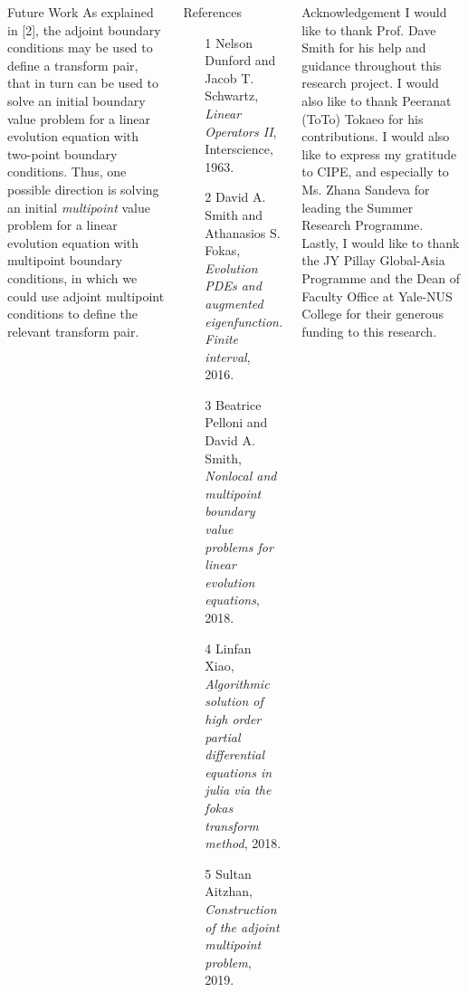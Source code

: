 \documentclass[serif, final, noamsthm]{beamer} %
\begin{document}
\begin{center}
\begin{frame}
\begin{columns}[t]
{\begin{block}{Future Work}
\justifying
As explained in [2], the adjoint boundary conditions may be used to define a transform pair, that in turn can be used to solve an initial boundary value problem for a linear evolution equation with two-point boundary conditions. Thus, one possible direction is solving an initial \emph{multipoint} value problem for a linear evolution equation with multipoint boundary conditions, in which we could use adjoint multipoint conditions to define the relevant transform pair. 
\end{block}
\begin{block}{References}
\begin{itemize}
\item[1] Nelson Dunford and Jacob T. Schwartz, \textit{Linear Operators II}, Interscience, 1963.
\item[2] David A. Smith and Athanasios S. Fokas, \textit{Evolution PDEs and augmented eigenfunction. Finite interval}, 2016.
\item[3] Beatrice Pelloni and David A. Smith, \textit{Nonlocal and multipoint boundary value problems for linear evolution equations}, 2018.
\item[4] Linfan Xiao, \textit{Algorithmic solution of high order partial differential equations in julia via the fokas transform method}, 2018.
\item[5] Sultan Aitzhan, \textit{Construction of the adjoint multipoint problem}, 2019.
\end{itemize}
\end{block}
          
\begin{block}{Acknowledgement}
\justifying
I would like to thank Prof. Dave Smith for his help and guidance throughout this research project. I would also like to thank Peeranat (ToTo) Tokaeo for his contributions. I would also like to express my gratitude to CIPE, and especially to Ms. Zhana Sandeva for leading the Summer Research Programme. Lastly, I would like to thank the JY Pillay Global-Asia Programme and the Dean of Faculty Office at Yale-NUS College for their generous funding to this research.
\end{block}
}
\end{columns}
\end{frame}

\end{center}
\end{document}
